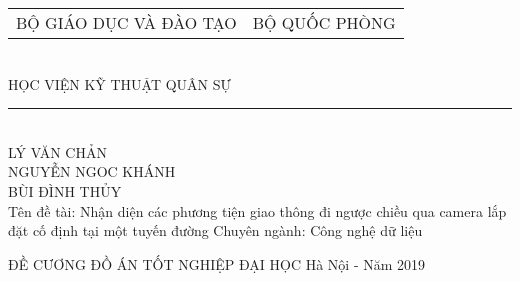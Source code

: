 \begin{center}
\vfill
\begin{tabular*}{0.8\linewidth}{@{\extracolsep{\fill}}cc}
	\large BỘ GIÁO DỤC VÀ ĐÀO TẠO  & \large BỘ QUỐC PHÒNG \\
\end{tabular*}
\\
\large HỌC VIỆN KỸ THUẬT QUÂN SỰ
\\
\rule{200px}{1px}\\


\vfill
{\LARGE 
	LÝ VĂN CHẢN \\
	NGUYỄN NGOC KHÁNH \\
	BÙI ĐÌNH THỦY\\
}
\bigbreak
Tên đề tài: Nhận diện các phương tiện giao thông đi ngược chiều qua camera lắp đặt cố định tại một tuyến đường
\bigbreak
Chuyên ngành: Công nghệ dữ liệu
\bigbreak

ĐỀ CƯƠNG ĐỒ ÁN TỐT NGHIỆP ĐẠI HỌC 
\bigbreak
\vfill
Hà Nội - Năm 2019
\end{center}
